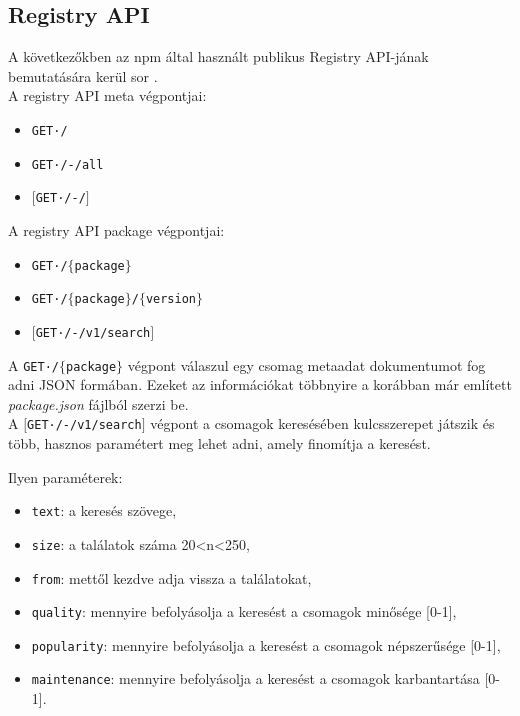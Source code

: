 \subsection{Registry API}

A következőkben az npm által használt publikus Registry API-jának bemutatására kerül sor \cite{npm-registry-api}.\\

\noindent A registry API meta végpontjai:

\begin{itemize}
	\item \texttt{GET·/}
	\item \texttt{GET·/-/all}
	\item \texttt{$\big[$GET·/-/$\big]$}
\end{itemize}

\noindent A registry API package végpontjai:

\begin{itemize}
	\item \texttt{GET·/$\bigl\{$package$\bigr\}$}
	\item \texttt{GET·/$\bigl\{$package$\bigr\}$/$\bigl\{$version$\bigr\}$}
	\item \texttt{$\big[$GET·/-/v1/search$\big]$}
\end{itemize}

A \texttt{GET·/$\bigl\{$package$\bigr\}$} végpont válaszul egy csomag metaadat dokumentumot fog adni JSON formában. Ezeket az információkat többnyire a korábban már említett \emph{package.json} fájlból szerzi be.\\

A \texttt{$\big[$GET·/-/v1/search$\big]$} végpont a csomagok keresésében kulcsszerepet játszik és több, hasznos paramétert meg lehet adni, amely finomítja a keresést.

Ilyen paraméterek:

\begin{itemize}
	\item \texttt{text}: a keresés szövege,
	\item \texttt{size}: a találatok száma 20<n<250,
	\item \texttt{from}: mettől kezdve adja vissza a találatokat,
	\item \texttt{quality}: mennyire befolyásolja a keresést a csomagok minősége [0-1],
	\item \texttt{popularity}: mennyire befolyásolja a keresést a csomagok népszerűsége [0-1],
	\item \texttt{maintenance}: mennyire befolyásolja a keresést a csomagok karbantartása [0-1].
\end{itemize}

